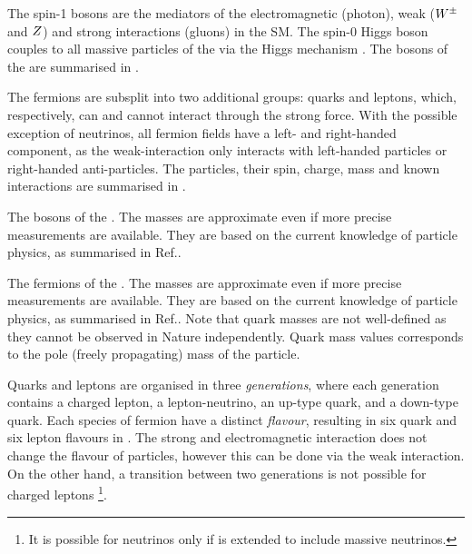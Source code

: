 The spin-1 bosons are the mediators of the electromagnetic (photon), weak ($W^\pm$ and $Z$) and strong interactions (gluons) in the SM.
The spin-0 Higgs boson couples to all massive particles of the \SM via the Higgs mechanism \cite{PhysRevLett.13.508}.
The bosons of the \SM are summarised in .

The fermions are subsplit into two additional groups: quarks and leptons, which, respectively, can and cannot interact through the strong force.
With the possible exception of neutrinos, all fermion fields have a left- and right-handed component, as the weak-interaction only interacts with
left-handed particles or right-handed anti-particles.
The particles, their spin, charge, mass and known interactions are summarised in .

\begin{table}[htbp!]
    \centering
    \caption{\label{tab:standard_model_bosons}
    The bosons of the \SM.
    The masses are approximate even if more precise measurements are available.
    They are based on the current knowledge of particle physics, as summarised in Ref.\cite{Workman:2022ynf}.
    }

\end{table}
\begin{table}[htbp!]
    \centering
    \caption{\label{tab:standard_model_fermions}
    The fermions of the \SM.
    The masses are approximate even if more precise measurements are available.
    They are based on the current knowledge of particle physics, as summarised in Ref.\cite{Workman:2022ynf}.
    Note that quark masses are not well-defined as they cannot be observed in Nature independently.
    Quark mass values corresponds to the pole (freely propagating) mass of the particle.
    }

\end{table}

Quarks and leptons are organised in three \textit{generations}, 
where each generation contains a charged lepton, a lepton-neutrino, an up-type quark, and a down-type quark.
Each species of fermion have a distinct \textit{flavour}, resulting in six quark and six lepton flavours in \SM.
The strong and electromagnetic interaction does not change the flavour of particles, 
however this can be done via the weak interaction.
On the other hand, a transition between two generations is not possible for charged leptons
\footnote{It is possible for neutrinos only if \SM is extended to include massive neutrinos.}.

